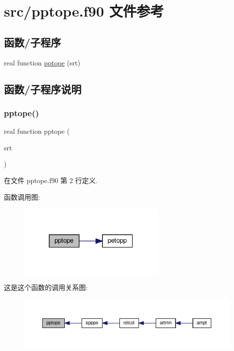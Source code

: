\hypertarget{pptope_8f90}{}\section{src/pptope.f90 文件参考}
\label{pptope_8f90}
\subsection*{函数/子程序}
\begin{DoxyCompactItemize}
\item 
real function \mbox{\hyperlink{pptope_8f90_ae7ada948a8fe20a519f3f733363f70ba}{pptope}} (srt)
\end{DoxyCompactItemize}


\subsection{函数/子程序说明}
\mbox{\label{pptope_8f90_ae7ada948a8fe20a519f3f733363f70ba}} 
\subsubsection{\texorpdfstring{pptope()}{pptope()}}
{\footnotesize\ttfamily real function pptope (\begin{DoxyParamCaption}\item[{}]{srt }\end{DoxyParamCaption})}



在文件 pptope.\+f90 第 2 行定义.

函数调用图\+:
\nopagebreak
\begin{figure}[H]
\begin{center}
\leavevmode
\includegraphics[width=208pt]{pptope_8f90_ae7ada948a8fe20a519f3f733363f70ba_cgraph}
\end{center}
\end{figure}
这是这个函数的调用关系图\+:
\nopagebreak
\begin{figure}[H]
\begin{center}
\leavevmode
\includegraphics[width=350pt]{pptope_8f90_ae7ada948a8fe20a519f3f733363f70ba_icgraph}
\end{center}
\end{figure}
